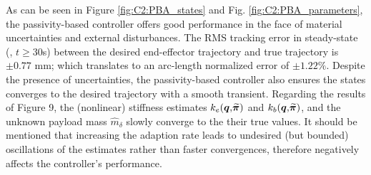 %

%



As can be seen in Figure \ref{fig:C2:PBA_states} and Fig. \ref{fig:C2:PBA_parameters}, the passivity-based controller offers good performance in the face of material uncertainties and external disturbances. The RMS tracking error in steady-state (\ie, $t \ge 30$s) between the desired end-effector trajectory and true trajectory is $\pm0.77$ mm; which translates to an arc-length normalized error of $\pm1.22\%$. Despite the presence of uncertainties, the passivity-based controller also ensures the states converges to the desired trajectory with a smooth transient. Regarding the results of Figure 9, the (nonlinear) stiffness estimates ${k}_e({\boldsymbol{q}},\widetilde{\!\boldsymbol{\pi}})$ and $k_b({\boldsymbol{q}},\widetilde{\!\boldsymbol{\pi}})$, and the unknown payload mass $\hat{m}_\delta$ slowly converge to the their true values. It should be mentioned that increasing the adaption rate leads to undesired (but bounded) oscillations of the estimates rather than faster convergences, therefore negatively affects the controller's performance.
